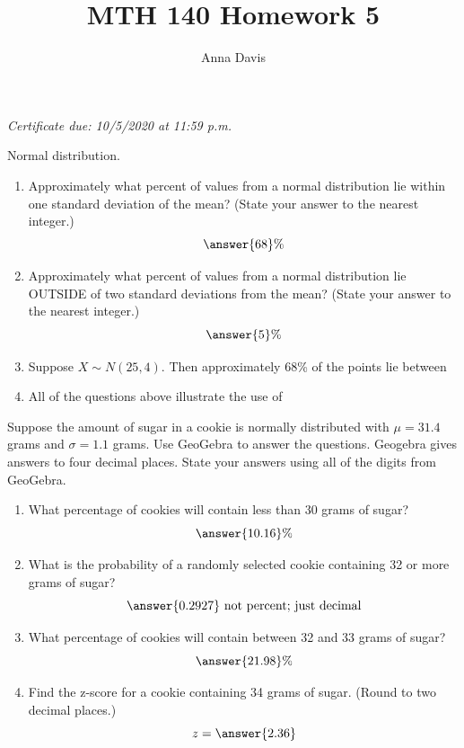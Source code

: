 \documentclass{ximera}
\author{Anna Davis} \title{MTH 140 Homework 5}
\begin{document}
\begin{abstract}

\end{abstract}
\maketitle
 \textit{Certificate due: 10/5/2020 at 11:59 p.m.}
\begin{problem}\label{prob:140hom5prob1}
Normal distribution.
\begin{enumerate} 
\item
Approximately what percent of values from a normal distribution lie within one standard deviation of the mean? (State your answer to the nearest integer.)
$$\answer{68}\%$$
\item Approximately what percent of values from a normal distribution lie OUTSIDE of two standard deviations from the mean?  (State your answer to the nearest integer.)
$$\answer{5}\%$$
\item Suppose $X\sim N(25, 4)$.  Then approximately 68\% of the points lie between 

\item All of the questions above illustrate the use of 
\end{enumerate}

\end{problem}

\begin{problem}\label{prob:140hom5prob2}
Suppose the amount of sugar in a cookie is normally distributed with $\mu=31.4$ grams and $\sigma=1.1$ grams.  Use GeoGebra to answer the questions.  Geogebra gives answers to four decimal places.  State your answers using all of the digits from GeoGebra.
\begin{center}  
\end{center}
\begin{enumerate}
    \item What percentage of cookies will contain less than 30 grams of sugar?
    $$\answer{10.16}\%$$
    \item What is the probability of a randomly selected cookie containing 32 or more grams of sugar?
    $$\answer{0.2927}\mbox{ not percent; just decimal}$$
    \item What percentage of cookies will contain between 32 and 33 grams of sugar?
    $$\answer{21.98}\%$$
    \item Find the z-score for a cookie containing 34 grams of sugar.  (Round to two decimal places.)
    $$z=\answer{2.36}$$
\end{enumerate}
\end{problem}
\end{document}
